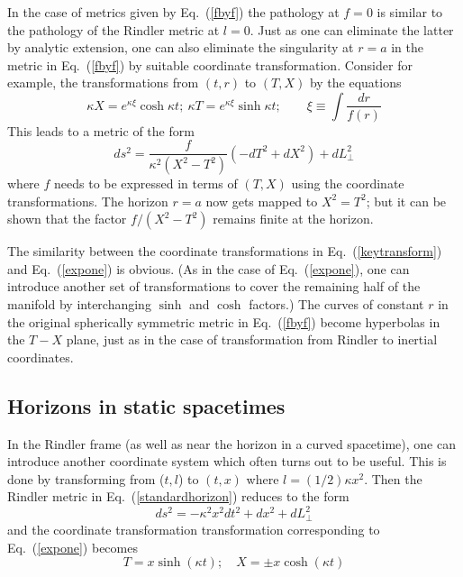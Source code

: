 \documentclass[12pt]{iopart}
\def\eq#1{{Eq.~(\ref{#1})}}
\begin{document}
In the case of  metrics given by \eq{fbyf} the pathology at $f =0$ is similar to the pathology
of the Rindler metric at $l=0$. Just as one can eliminate the latter by analytic extension,
one can also eliminate the singularity at $r=a$ in the metric in \eq{fbyf} by suitable coordinate transformation. Consider for example, the transformations from $(t,r)$ to
$(T,X)$ by the equations
\begin{equation}
  \kappa X=e^{ \kappa\xi} \cosh  \kappa t; \  \kappa T=e^{ \kappa\xi} \sinh  \kappa t;
  \qquad \xi \equiv \int \frac{dr}{f(r)}
  \label{keytransform}
  \end{equation}
  This leads to a metric of the form 
  \begin{equation}
  ds^2 =\frac{f}{ \kappa^2(X^2 - T^2)} (-dT^2 +dX^2) + dL_\perp^2
  \end{equation}
  where $f$ needs to be expressed in terms of $(T,X)$ using the coordinate transformations.
  The horizon $r=a$ now gets mapped to $X^2 = T^2$; but it can be shown that the factor
  $f/(X^2 - T^2)$ remains finite at the horizon. 
  
  
  The similarity between the coordinate transformations in \eq{keytransform}
  and \eq{expone}
is obvious. (As in the case of \eq{expone}, one can introduce another set of transformations to cover the remaining half of the manifold by interchanging $\sinh$ and $\cosh$ factors.)
The curves of constant $r$ in the original spherically symmetric metric in \eq{fbyf}
become hyperbolas in the $T-X$ plane, just as in the case of transformation from Rindler to inertial coordinates.

  
  
 




\subsection{Horizons in static spacetimes}

In the Rindler frame (as well as  near the horizon in a curved spacetime), one can introduce another coordinate system which often turns out to be useful.
This is done by transforming from ($t,l$) to $(t, x)$ where 
$ l = (1/2) \kappa x^2$. Then the Rindler metric in \eq{standardhorizon} reduces to the form
\begin{equation}
   ds^2=-\kappa^2 x^2 dt^2 + dx^2 + dL_\perp^2
   \label{dsfirst}
   \end{equation}
and the coordinate transformation transformation corresponding to \eq{expone}
becomes 
  \begin{equation}
  T=x \sinh (\kappa t); \quad X=\pm x \cosh (\kappa t)
   \label{expthree}
   \end{equation}
\end{document}

